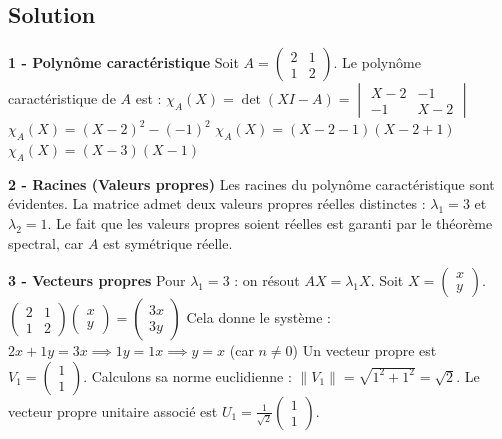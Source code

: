 \documentclass[11pt,a4paper]{article}
\begin{document}
\subsection{Solution}

\textbf{1 - Polynôme caractéristique}
Soit $A = \begin{pmatrix} 2 & 1 \\ 1 & 2 \end{pmatrix}$.
Le polynôme caractéristique de $A$ est :
$\chi_A(X) = \det(X I - A) = \begin{vmatrix} X - 2 & -1 \\ -1 & X - 2 \end{vmatrix}$
$\chi_A(X) = (X - 2)^2 - (-1)^2$
$\chi_A(X) = (X - 2 - 1)(X - 2 + 1)$
$\chi_A(X) = (X - 3)(X - 1)$

\textbf{2 - Racines (Valeurs propres)}
Les racines du polynôme caractéristique sont évidentes. La matrice admet deux valeurs propres réelles distinctes :
$\lambda_1 = 3$ et $\lambda_2 = 1$.
Le fait que les valeurs propres soient réelles est garanti par le théorème spectral, car $A$ est symétrique réelle.

\textbf{3 - Vecteurs propres}
Pour $\lambda_1 = 3$ : on résout $AX = \lambda_1 X$.
Soit $X = \begin{pmatrix} x \\ y \end{pmatrix}$.
$\begin{pmatrix} 2 & 1 \\ 1 & 2 \end{pmatrix} \begin{pmatrix} x \\ y \end{pmatrix} = \begin{pmatrix} 3x \\ 3y \end{pmatrix}$
Cela donne le système :
$2x + 1y = 3x \implies 1y = 1x \implies y = x$ (car $n \neq 0$)
Un vecteur propre est $V_1 = \begin{pmatrix} 1 \\ 1 \end{pmatrix}$.
Calculons sa norme euclidienne : $\|V_1\| = \sqrt{1^2 + 1^2} = \sqrt{2}$.
Le vecteur propre unitaire associé est $U_1 = \frac{1}{\sqrt{2}} \begin{pmatrix} 1 \\ 1 \end{pmatrix}$.
\end{document}
